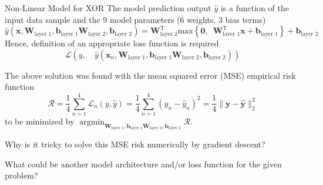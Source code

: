 \documentclass[mathserif, aspectratio=1610]{intbeamer}
\begin{document}
\begin{frame}[t]{Non-Linear Model for XOR}
The model prediction output $\hat{y}$ is a function of the input data sample and the 9 model parameters (6 weights, 3 bias terms)
$$
\hat{y}\left(\bm{x},\bm{W}_\text{layer 1}, \bm{b}_\text{layer 1}
\bm{W}_\text{layer 2}, \bm{b}_\text{layer 2}\right)
=
\bm{W}_\text{layer 2}^\mathrm{T}
\mathrm{max}\left\{\bm{0},\,\,\,\bm{W}_\text{layer 1}^\mathrm{T} \bm{x} + \bm{b}_\text{layer 1}\right\}
+ \bm{b}_\text{layer 2}
$$
Hence, definition of an appropriate loss function is required
$$
\mathcal{L}\left(y,\quad\hat{y}\left(\bm{x}_n, \bm{W}_\text{layer 1}, \bm{b}_\text{layer 1}
\bm{W}_\text{layer 2}, \bm{b}_\text{layer 2}\right)\right)
$$

The above solution was found with the mean squared error (MSE) empirical risk function
$$\mathcal{R} = \frac{1}{4}\sum_{n=1}^4 \mathcal{L}_n(y, \hat{y}) = \frac{1}{4}\sum_{n=1}^4 (y_n-\hat{y}_n)^2 = \frac{1}{4}\lVert\bm{y} - \hat{\bm{y}}\rVert_2^2$$
to be minimized by $\operatorname*{argmin}_{\bm{W}_\text{layer 1}, \bm{b}_\text{layer 1}
\bm{W}_\text{layer 2}, \bm{b}_\text{layer 2}} \mathcal{R}$.

Why is it tricky to solve this MSE risk numerically by gradient descent?

What could be another model architecture and/or loss function for the given problem?



\end{frame}
\end{document}
